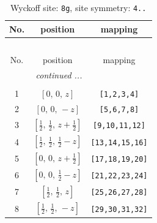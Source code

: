 \documentclass[fleqn,8pt]{jsarticle}
\begin{document}
\begin{longtable}{ccc}
\caption{Wyckoff site: {\tt 8g}, site symmetry: {\tt 4..}}
 \\
 \hline \hline
No. & position & mapping \\ \hline \endfirsthead

\multicolumn{2}{l}{\tablename\ \thetable{}} \\
 \hline \hline
No. & position & mapping \\ \hline \endhead

 \hline \hline
\multicolumn{2}{r}{\footnotesize\it continued ...} \\ \endfoot

 \hline \hline
\multicolumn{2}{r}{} \\ \endlastfoot

1 & $\left[ 0,\, 0,\, z \right]$ & {\tt [1,2,3,4]} \\ \hline
2 & $\left[ 0,\, 0,\, - z \right]$ & {\tt [5,6,7,8]} \\ \hline
3 & $\left[ \frac{1}{2},\, \frac{1}{2},\, z + \frac{1}{2} \right]$ & {\tt [9,10,11,12]} \\ \hline
4 & $\left[ \frac{1}{2},\, \frac{1}{2},\, \frac{1}{2} - z \right]$ & {\tt [13,14,15,16]} \\ \hline
5 & $\left[ 0,\, 0,\, z + \frac{1}{2} \right]$ & {\tt [17,18,19,20]} \\ \hline
6 & $\left[ 0,\, 0,\, \frac{1}{2} - z \right]$ & {\tt [21,22,23,24]} \\ \hline
7 & $\left[ \frac{1}{2},\, \frac{1}{2},\, z \right]$ & {\tt [25,26,27,28]} \\ \hline
8 & $\left[ \frac{1}{2},\, \frac{1}{2},\, - z \right]$ & {\tt [29,30,31,32]} \\
\end{longtable}
\renewcommand{\arraystretch}{1.2}
\end{document}
